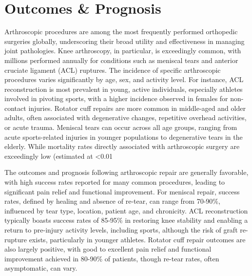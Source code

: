 \section*{Outcomes \& Prognosis}
Arthroscopic procedures are among the most frequently performed orthopedic surgeries globally, underscoring their broad utility and effectiveness in managing joint pathologies. Knee arthroscopy, in particular, is exceedingly common, with millions performed annually for conditions such as meniscal tears and anterior cruciate ligament (ACL) ruptures. The incidence of specific arthroscopic procedures varies significantly by age, sex, and activity level. For instance, ACL reconstruction is most prevalent in young, active individuals, especially athletes involved in pivoting sports, with a higher incidence observed in females for non-contact injuries. Rotator cuff repairs are more common in middle-aged and older adults, often associated with degenerative changes, repetitive overhead activities, or acute trauma. Meniscal tears can occur across all age groups, ranging from acute sports-related injuries in younger populations to degenerative tears in the elderly. While mortality rates directly associated with arthroscopic surgery are exceedingly low (estimated at <0.01%

The outcomes and prognosis following arthroscopic repair are generally favorable, with high success rates reported for many common procedures, leading to significant pain relief and functional improvement. For meniscal repair, success rates, defined by healing and absence of re-tear, can range from 70-90\%, influenced by tear type, location, patient age, and chronicity. ACL reconstruction typically boasts success rates of 85-95\% in restoring knee stability and enabling a return to pre-injury activity levels, including sports, although the risk of graft re-rupture exists, particularly in younger athletes. Rotator cuff repair outcomes are also largely positive, with good to excellent pain relief and functional improvement achieved in 80-90\% of patients, though re-tear rates, often asymptomatic, can vary.

